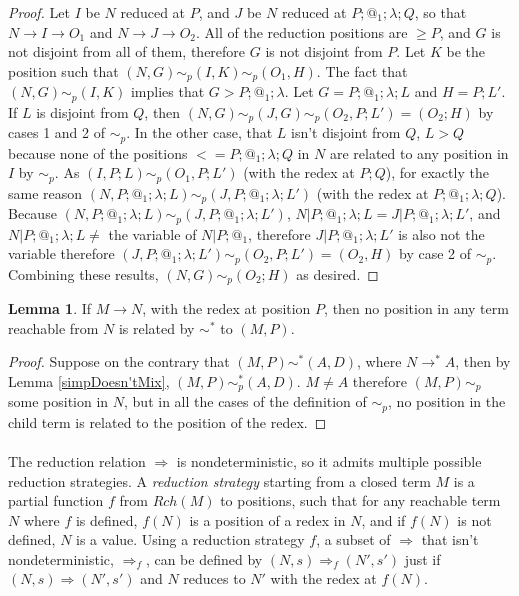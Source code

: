 \documentclass{article}
\theoremstyle{definition}
\theoremstyle{lemma}
\newtheorem{lemma}{Lemma}
\theoremstyle{remark}
\begin{document}
\begin{proof}
Let $I$ be $N$ reduced at $P$, and $J$ be $N$ reduced at $P;@_1;\lambda;Q$, so that $N \to I \to O_1$ and $N \to J \to O_2$. All of the reduction positions are $\geq P$, and $G$ is not disjoint from all of them, therefore $G$ is not disjoint from $P$. Let $K$ be the position such that $(N,G) \sim_p (I,K) \sim_p (O_1,H)$. The fact that $(N,G) \sim_p (I,K)$ implies that $G > P;@_1;\lambda$. Let $G = P;@_1;\lambda;L$ and $H = P;L'$. If $L$ is disjoint from $Q$, then $(N,G) \sim_p (J,G) \sim_p (O_2,P;L') = (O_2;H)$ by cases 1 and 2 of $\sim_p$. In the other case, that $L$ isn't disjoint from $Q$, $L > Q$ because none of the positions $<= P;@_1;\lambda;Q$ in $N$ are related to any position in $I$ by $\sim_p$. As $(I,P;L) \sim_p (O_1,P;L')$ (with the redex at $P;Q$), for exactly the same reason $(N,P;@_1;\lambda;L) \sim_p (J,P;@_1;\lambda;L')$ (with the redex at $P;@_1;\lambda;Q$). Because $(N,P;@_1;\lambda;L) \sim_p (J,P;@_1;\lambda;L')$, $N|P;@_1;\lambda;L = J|P;@_1;\lambda;L'$, and $N|P;@_1;\lambda;L \neq $ the variable of $N|P;@_1$, therefore $J|P;@_1;\lambda;L'$ is also not the variable therefore $(J,P;@_1;\lambda;L') \sim_p (O_2, P;L') = (O_2, H)$ by case 2 of $\sim_p$. Combining these results, $(N,G) \sim_p (O_2;H)$ as desired.
\end{proof}

\begin{lemma} \label{lem:redexDestroyed}
If $M \to N$, with the redex at position $P$, then no position in any term reachable from $N$ is related by $\sim^*$ to $(M,P)$.
\end{lemma}
\begin{proof}
Suppose on the contrary that $(M,P) \sim^* (A,D)$, where $N \to^* A$, then by Lemma \ref{simpDoesn'tMix}, $(M,P) \sim_p^* (A,D)$. $M \neq A$ therefore $(M,P) \sim_p$ some position in $N$, but in all the cases of the definition of $\sim_p$, no position in the child term is related to the position of the redex.
\end{proof}

\paragraph{}
The reduction relation $\Rightarrow$ is nondeterministic, so it admits multiple possible reduction strategies. 
A \emph{reduction strategy} starting from a closed term $M$ is a partial function $f$ from $Rch(M)$ to positions, such that for any reachable term $N$ where $f$ is defined, $f(N)$ is a position of a redex in $N$, and if $f(N)$ is not defined, $N$ is a value.
Using a reduction strategy $f$, a subset of $\Rightarrow$ that isn't nondeterministic, $\Rightarrow_f$, can be defined by $(N,s) \Rightarrow_f (N',s')$ just if $(N,s) \Rightarrow (N',s')$ and $N$ reduces to $N'$ with the redex at $f(N)$.
\end{document}
